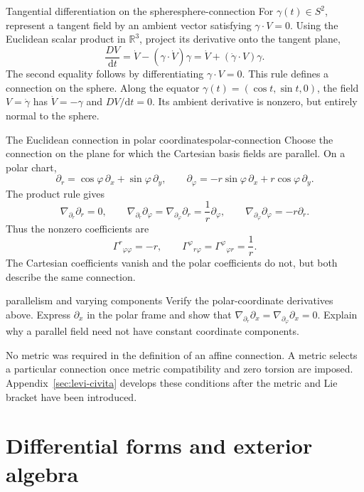 \documentclass[11pt,a4paper]{article}
\numberwithin{equation}{section}
\newcommand{\R}{\mathbb R}
\newcommand{\dd}{\mathrm d}
\newcommand{\slideref}[1]{\par\nobreak\smallskip\nobreak{\footnotesize\color{ink!60}\textsc{Source slide #1}}\par\nobreak\smallskip\nobreak}
\begin{document}
\begin{examplebox}{Tangential differentiation on the sphere}{sphere-connection}
For \(\gamma(t)\in S^2\), represent a tangent field by an ambient
vector satisfying \(\gamma\cdot V=0\). Using the Euclidean scalar
product in \(\R^3\), project its derivative onto the tangent plane,
\[
 \frac{DV}{\dd t}
 =\dot V-(\gamma\cdot\dot V)\gamma
 =\dot V+(\dot\gamma\cdot V)\gamma.
\]
The second equality follows by differentiating
\(\gamma\cdot V=0\). This rule defines a connection on the sphere.
Along the equator \(\gamma(t)=(\cos t,\sin t,0)\), the field
\(V=\dot\gamma\) has \(\dot V=-\gamma\) and \(DV/\dd t=0\).
Its ambient derivative is nonzero, but entirely normal to the sphere.
\end{examplebox}

\begin{examplebox}{The Euclidean connection in polar coordinates}{polar-connection}
Choose the connection on the plane for which the Cartesian basis fields
are parallel. On a polar chart,
\[
 \partial_r=\cos\varphi\,\partial_x+\sin\varphi\,\partial_y,
 \qquad
 \partial_\varphi=-r\sin\varphi\,\partial_x+r\cos\varphi\,\partial_y.
\]
The product rule gives
\[
 \nabla_{\partial_r}\partial_r=0,\qquad
 \nabla_{\partial_r}\partial_\varphi
 =\nabla_{\partial_\varphi}\partial_r=\frac1r\partial_\varphi,
 \qquad
 \nabla_{\partial_\varphi}\partial_\varphi=-r\partial_r.
\]
Thus the nonzero coefficients are
\[
 \Gamma^r{}_{\varphi\varphi}=-r,\qquad
 \Gamma^\varphi{}_{r\varphi}=\Gamma^\varphi{}_{\varphi r}=\frac1r.
\]
The Cartesian coefficients vanish and the polar coefficients do not,
but both describe the same connection.
\end{examplebox}

\begin{studentwork}[3.8cm]{parallelism and varying components}
Verify the polar-coordinate derivatives above. Express \(\partial_x\)
in the polar frame and show that
\(\nabla_{\partial_r}\partial_x=\nabla_{\partial_\varphi}\partial_x=0\).
Explain why a parallel field need not have constant coordinate components.
\end{studentwork}

No metric was required in the definition of an affine connection.
A metric selects a particular connection once metric compatibility and
zero torsion are imposed. Appendix~\ref{sec:levi-civita} develops these
conditions after the metric and Lie bracket have been introduced.

\section{Differential forms and exterior algebra}
\label{sec:forms}
\slideref{15}
\end{document}

